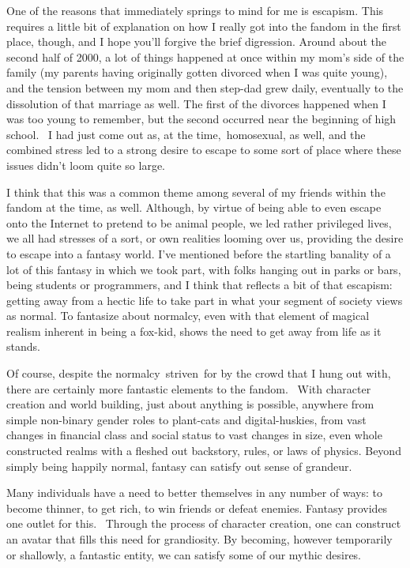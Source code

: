 One of the reasons that immediately springs to mind for me is escapism.
This requires a little bit of explanation on how I really got into the
fandom in the first place, though, and I hope you'll forgive the brief
digression. Around about the second half of 2000, a lot of things
happened at once within my mom's side of the family (my parents having
originally gotten divorced when I was quite young), and the tension
between my mom and then step-dad grew daily, eventually to the
dissolution of that marriage as well. The first of the divorces happened
when I was too young to remember, but the second occurred near the
beginning of high school. ~I had just come out as, at the
time,~homosexual, as well, and the combined stress led to a strong
desire to escape to some sort of place where these issues didn't loom
quite so large.

I think that this was a common theme among several of my friends within
the fandom at the time, as well. Although, by virtue of being able to
even escape onto the Internet to pretend to be animal people, we led
rather privileged lives, we all had stresses of a sort, or own realities
looming over us, providing the desire to escape into a fantasy world.
I've mentioned before the startling banality of a lot of this fantasy in
which we took part, with folks hanging out in parks or bars, being
students or programmers, and I think that reflects a bit of that
escapism: getting away from a hectic life to take part in what your
segment of society views as normal. To fantasize about normalcy, even
with that element of magical realism inherent in being a fox-kid, shows
the need to get away from life as it stands.

Of course, despite the normalcy~striven~for by the crowd that I hung out
with, there are certainly more fantastic elements to the fandom. ~With
character creation and world building, just about anything is possible,
anywhere from simple non-binary gender roles to plant-cats and
digital-huskies, from vast changes in financial class and social status
to vast changes in size, even whole constructed realms with a fleshed
out backstory, rules, or laws of physics. Beyond simply being happily
normal, fantasy can satisfy out sense of grandeur.

Many individuals have a need to better themselves in any number of ways:
to become thinner, to get rich, to win friends or defeat enemies.
Fantasy provides one outlet for this. ~Through the process of character
creation, one can construct an avatar that fills this need for
grandiosity. By becoming, however temporarily or shallowly, a fantastic
entity, we can satisfy some of our mythic desires.

